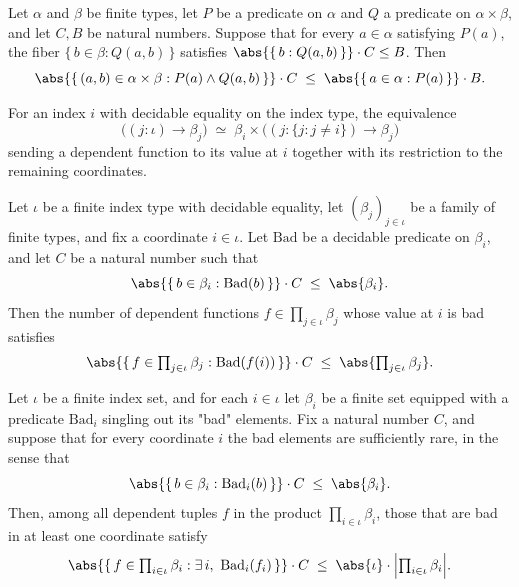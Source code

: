 \begin{lemma}
\label{RazborovSmolensky.prod_filter_fiber_mul_le}
\leanok
{}
Let $\alpha$ and $\beta$ be finite types, let $P$ be a predicate on $\alpha$ and $Q$ a
predicate on $\alpha \times \beta$, and let $C, B$ be natural numbers. Suppose that for
every $a \in \alpha$ satisfying $P(a)$, the fiber $\{\,b \in \beta : Q(a,b)\,\}$
satisfies $\abs{\{\,b : Q(a,b)\,\}} \cdot C \le B$. Then
\[
\abs{\{\,(a,b) \in \alpha \times \beta : P(a) \wedge Q(a,b)\,\}} \cdot C
\;\le\;
\abs{\{\,a \in \alpha : P(a)\,\}} \cdot B .
\]
\end{lemma}

\begin{definition}
\label{RazborovSmolensky.piEquivAt}
\leanok
For an index $i$ with decidable equality on the index type, the equivalence
\[
\bigl((j : \iota) \to \beta_j\bigr) \;\simeq\; \beta_i \times \bigl((j : \{j : j \ne i\}) \to \beta_j\bigr)
\]
sending a dependent function to its value at $i$ together with its restriction to the remaining
coordinates.
\end{definition}

\begin{lemma}
\label{RazborovSmolensky.pi_coordinate_bad_mul_le}
\leanok
{}
Let $\iota$ be a finite index type with decidable equality, let $(\beta_j)_{j \in
\iota}$ be a family of finite types, and fix a coordinate $i \in \iota$. Let
$\mathrm{Bad}$ be a decidable predicate on $\beta_i$, and let $C$ be a natural number
such that
\[
\abs{\{\, b \in \beta_i : \mathrm{Bad}(b) \,\}} \cdot C \;\le\; \abs{\beta_i}.
\]
Then the number of dependent functions $f \in \prod_{j \in \iota} \beta_j$ whose value
at $i$ is bad satisfies
\[
\abs{\{\, f \in \textstyle\prod_{j \in \iota} \beta_j : \mathrm{Bad}(f(i)) \,\}} \cdot C
\;\le\; \abs{\textstyle\prod_{j \in \iota} \beta_j}.
\]
\end{lemma}

\begin{lemma}
\label{RazborovSmolensky.pi_exists_bad_card_mul_le}
\leanok
{}
Let $\iota$ be a finite index set, and for each $i \in \iota$ let $\beta_i$ be a finite
set equipped with a predicate $\mathrm{Bad}_i$ singling out its "bad" elements. Fix a
natural number $C$, and suppose that for every coordinate $i$ the bad elements are
sufficiently rare, in the sense that
\[
\abs{\{\, b \in \beta_i : \mathrm{Bad}_i(b) \,\}}\cdot C \;\le\; \abs{\beta_i}.
\]
Then, among all dependent tuples $f$ in the product $\prod_{i \in \iota} \beta_i$, those
that are bad in at least one coordinate satisfy
\[
\abs{\{\, f \in \textstyle\prod_{i \in \iota}\beta_i : \exists\, i,\ \mathrm{Bad}_i(f_i)
\,\}}\cdot C \;\le\; \abs{\iota}\cdot\Bigl\lvert\textstyle\prod_{i \in
\iota}\beta_i\Bigr\rvert.
\]
\end{lemma}

